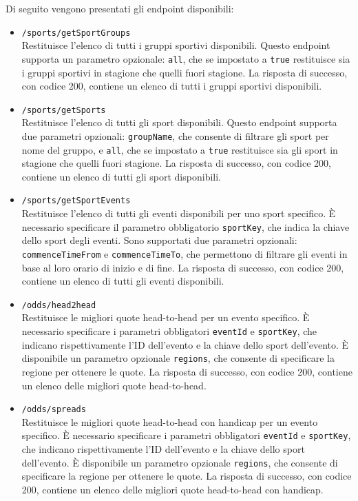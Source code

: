 Di seguito vengono presentati gli endpoint disponibili:
\begin{itemize}
    \item \texttt{/sports/getSportGroups}\\
    Restituisce l'elenco di tutti i gruppi sportivi disponibili. Questo endpoint supporta un parametro opzionale: \texttt{all}, che se impostato a \texttt{true} restituisce sia i gruppi sportivi in stagione che quelli fuori stagione. La risposta di successo, con codice 200, contiene un elenco di tutti i gruppi sportivi disponibili.
    \item \texttt{/sports/getSports}\\
    Restituisce l'elenco di tutti gli sport disponibili. Questo endpoint supporta due parametri opzionali: \texttt{groupName}, che consente di filtrare gli sport per nome del gruppo, e \texttt{all}, che se impostato a \texttt{true} restituisce sia gli sport in stagione che quelli fuori stagione. La risposta di successo, con codice 200, contiene un elenco di tutti gli sport disponibili.
    \item \texttt{/sports/getSportEvents}\\
    Restituisce l'elenco di tutti gli eventi disponibili per uno sport specifico. È necessario specificare il parametro obbligatorio \texttt{sportKey}, che indica la chiave dello sport degli eventi. Sono supportati due parametri opzionali: \texttt{commenceTimeFrom} e \texttt{commenceTimeTo}, che permettono di filtrare gli eventi in base al loro orario di inizio e di fine. La risposta di successo, con codice 200, contiene un elenco di tutti gli eventi disponibili.
    \item \texttt{/odds/head2head}\\
    Restituisce le migliori quote head-to-head per un evento specifico. È necessario specificare i parametri obbligatori \texttt{eventId} e \texttt{sportKey}, che indicano rispettivamente l'ID dell'evento e la chiave dello sport dell'evento. È disponibile un parametro opzionale \texttt{regions}, che consente di specificare la regione per ottenere le quote. La risposta di successo, con codice 200, contiene un elenco delle migliori quote head-to-head.
    \item \texttt{/odds/spreads}\\
    Restituisce le migliori quote head-to-head con handicap per un evento specifico. È necessario specificare i parametri obbligatori \texttt{eventId} e \texttt{sportKey}, che indicano rispettivamente l'ID dell'evento e la chiave dello sport dell'evento. È disponibile un parametro opzionale \texttt{regions}, che consente di specificare la regione per ottenere le quote. La risposta di successo, con codice 200, contiene un elenco delle migliori quote head-to-head con handicap.
\end{itemize}


